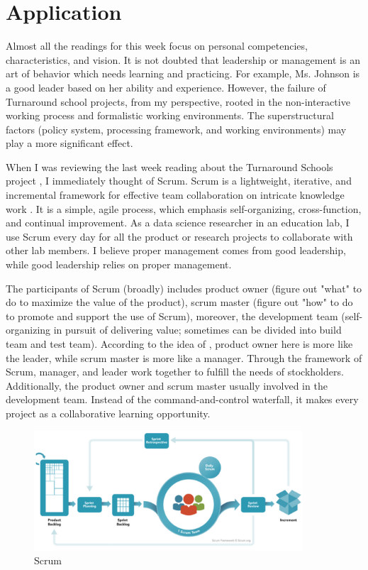 \documentclass[doc,biblatex,apacite]{apa6}
\begin{document}
\section{Application}
Almost all the readings for this week focus on personal competencies, characteristics, and vision.
It is not doubted that leadership or management is an art of behavior which needs learning and practicing.
For example, Ms. Johnson is a good leader based on her ability and experience.
However, the failure of Turnaround school projects, from my perspective, rooted in the non-interactive working process and formalistic working environments.
The superstructural factors (policy system, processing framework, and working environments) may play a more significant effect.

When I was reviewing the last week reading about the Turnaround Schools project \cite{Peurach2010}, I immediately thought of Scrum.
Scrum is a lightweight, iterative, and incremental framework for effective team collaboration on intricate knowledge work \cite{Schwaber2004}. 
It is a simple, agile process, which emphasis self-organizing, cross-function, and continual improvement.
As a data science researcher in an education lab, I use Scrum every day for all the product or research projects to collaborate with other lab members.
I believe proper management comes from good leadership, while good leadership relies on proper management.

The participants of Scrum (broadly) includes product owner (figure out "what" to do to maximize the value of the product), 
scrum master (figure out "how" to do to promote and support the use of Scrum), 
moreover, the development team (self-organizing in pursuit of delivering value; sometimes can be divided into build team and test team).
According to the idea of , product owner here is more like the leader, while scrum master is more like a manager.
Through the framework of Scrum, manager, and leader work together to fulfill the needs of stockholders.
Additionally, the product owner and scrum master usually involved in the development team.
Instead of the command-and-control waterfall, it makes every project as a collaborative learning opportunity.
\begin{figure}[hbt!]
    \centering
    \includegraphics[width=10cm]{Scrum.png}
    \caption{Scrum}
  \end{figure}
\end{document}
